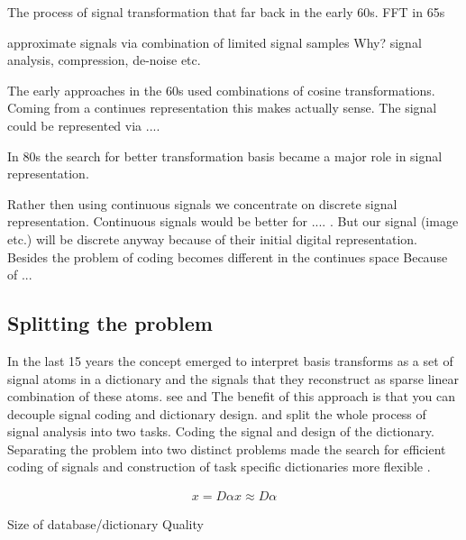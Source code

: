 The process of signal transformation that far back in the early 60s.\cite{Rubinstein2010}
FFT in 65s

approximate signals via combination of limited signal samples
Why?
signal analysis, compression, de-noise etc.

The early approaches in the 60s used combinations of cosine transformations. Coming from a continues representation this makes 
actually sense. The signal could be represented via ....

In 80s the search for better transformation basis became a major role in signal representation. \cite{}

Rather then using continuous signals we concentrate on discrete signal representation.
Continuous signals would be better for .... . But our signal (image etc.) will be discrete anyway because of their initial digital representation. 
Besides the problem of coding becomes different in the continues space \cite{} Because of ...

\subsection{Splitting the problem}
\cite{Rubinstein2010}
In the last 15 years the concept emerged to interpret basis transforms as a set of signal atoms in a dictionary and the signals 
that they reconstruct as sparse linear combination of these atoms.
see \cite{Olshausen1996} and \cite{}
The benefit of this approach is that you can decouple signal coding and dictionary design.
and split the whole process of signal analysis into two tasks. Coding the signal and design of the dictionary.
Separating the problem into two distinct problems made the search for efficient coding of signals and construction of task specific dictionaries more flexible \cite{?}.

\begin{align*}
 x = D\alpha  x \approx D\alpha
\end{align*}


Size of database/dictionary
Quality



